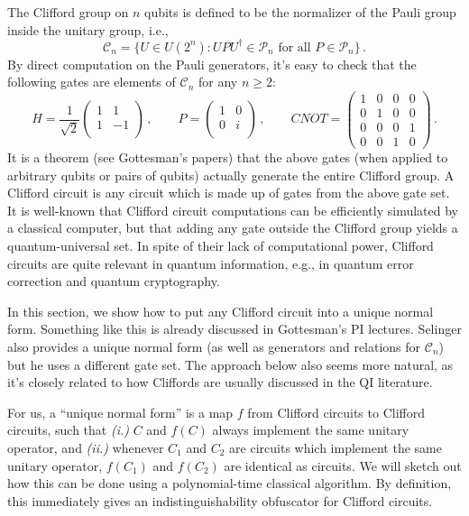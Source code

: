 \documentclass[11pt]{article}
\numberwithin{equation}{section}
\begin{document}
{The Clifford group on $n$ qubits is defined to be the normalizer of the Pauli group inside the unitary group, i.e.,
$$
\mathcal C_n = \{ U \in U(2^n) : U P U^\dagger \in \mathcal P_n \text{ for all } P \in \mathcal P_n\}\,.
$$
By direct computation on the Pauli generators, it's easy to check that the following gates are elements of $\mathcal C_n$ for any $n \geq 2$:
$$
H = \frac{1}{\sqrt{2}}
\begin{pmatrix} 
1 & 1 \\
1 & -1 \\
\end{pmatrix}\,,
\qquad
P = 
\begin{pmatrix} 
1 & 0 \\
0 & i \\
\end{pmatrix}\,,
\qquad
CNOT = 
\begin{pmatrix} 
1 & 0 & 0 & 0 \\
0 & 1 & 0 & 0 \\
0 & 0 & 0 & 1 \\
0 & 0 & 1 & 0
\end{pmatrix}\,.
$$
It is a theorem (see Gottesman's papers) that the above gates (when applied to arbitrary qubits or pairs of qubits) actually generate the entire Clifford group. A Clifford circuit is any circuit which is made up of gates from the above gate set. It is well-known that Clifford circuit computations can be efficiently simulated by a classical computer, but that adding any gate outside the Clifford group yields a quantum-universal set. In spite of their lack of computational power, Clifford circuits are quite relevant in quantum information, e.g., in quantum error correction and quantum cryptography.

In this section, we show how to put any Clifford circuit into a unique normal form. Something like this is already discussed in Gottesman's PI lectures. Selinger also provides a unique normal form (as well as generators and relations for $\mathcal C_n$) but he uses a different gate set. The approach below also seems more natural, as it's closely related to how Cliffords are usually discussed in the QI literature.

For us, a ``unique normal form'' is a map $f$ from Clifford circuits to Clifford circuits, such that \emph{(i.)} $C$ and $f(C)$ always implement the same unitary operator, and \emph{(ii.)} whenever $C_1$ and $C_2$ are circuits which implement the same unitary operator, $f(C_1)$ and $f(C_2)$ are identical as circuits. We will sketch out how this can be done using a polynomial-time classical algorithm. By definition, this immediately gives an indistinguishability obfuscator for Clifford circuits. 

}
\end{document}
